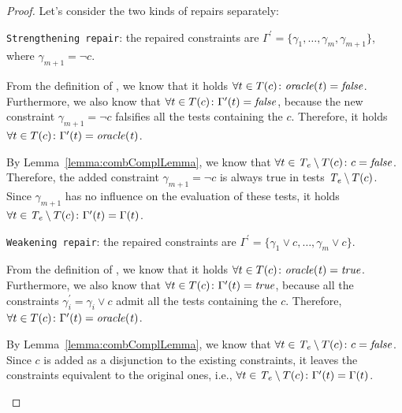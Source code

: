 \begin{tikzborder}{\cite{Gargantini16:validation}}
\begin{tikzborder}{\cite{gargantini_combinatorial_2017}}
\begin{tikzborder}{\cite{gargantini_combinatorial_2017}}
\begin{tikzborder}{\cite{garn2019}}
\begin{tikzborder}{\cite{arcaini2019achieving}}
\begin{tikzborder}{\cite{arcaini2019varivolution}}
		\begin{proof}
			Let's consider the two kinds of repairs separately:
			\begin{compactitem}
				\item {\tt Strengthening repair}: the repaired constraints are $\Gamma^\prime = \{\gamma_1, \dots, \gamma_m, \gamma_{m+1}\}$, where $\gamma_{m+1} = \neg c$.
				\begin{compactenum}
					\item From the definition of \underConstr \fcc, we know that it holds $\forall t \in T(c) \colon \mathit{oracle(t)} = \mathit{false}$. Furthermore, we also know that $\forall t \in T(c) \colon \Gamma^\prime(t) = \mathit{false}$, because the new constraint $\gamma_{m+1} = \neg c$ falsifies all the tests containing the \fcc $c$. Therefore, it holds $\forall t \in T(c) \colon \Gamma^\prime(t) = \mathit{oracle(t)}$.
					\item
					By Lemma~\ref{lemma:combComplLemma}, we know that $\forall t \in \mathit{T_e} \setminus T(c) \colon c = \mathit{false}$.
					Therefore, the added constraint $\gamma_{m+1} = \neg c$ is always true in tests $\mathit{T_e} \setminus T(c)$. Since $\gamma_{m+1}$ has no influence on the evaluation of these tests, it holds $\forall t \in \mathit{T_e} \setminus T(c) \colon \Gamma^\prime(t) = \Gamma(t)$.
				\end{compactenum}
				\item {\tt Weakening repair}: the repaired constraints are $\Gamma^\prime = \{ \gamma_1 \vee c, \dots, \gamma_m \vee c\}$.
				\begin{compactenum}
					\item From the definition of \overConstr \fcc, we know that it holds $\forall t \in T(c) \colon \mathit{oracle(t)} = \mathit{true}$.
					Furthermore, we also know that $\forall t \in T(c) \colon \Gamma^\prime(t) = \mathit{true}$, because all the constraints $\gamma_i^\prime = \gamma_i \vee c$ admit all the tests containing the \fcc $c$. Therefore, $\forall t \in T(c) \colon \Gamma^\prime(t) = \mathit{oracle(t)}$.
					\item
					By Lemma~\ref{lemma:combComplLemma}, we know that $\forall t \in \mathit{T_e} \setminus T(c) \colon c = \mathit{false}$. Since $c$ is added as a disjunction to the existing constraints, it leaves the constraints equivalent to the original ones, i.e., $\forall t \in \mathit{T_e} \setminus T(c) \colon \Gamma^\prime(t) = \Gamma(t)$.
				\end{compactenum}
			\end{compactitem}
		\end{proof}
		\be
		

\end{tikzborder}
\end{tikzborder}
\end{tikzborder}
\end{tikzborder}
\end{tikzborder}
\end{tikzborder}
